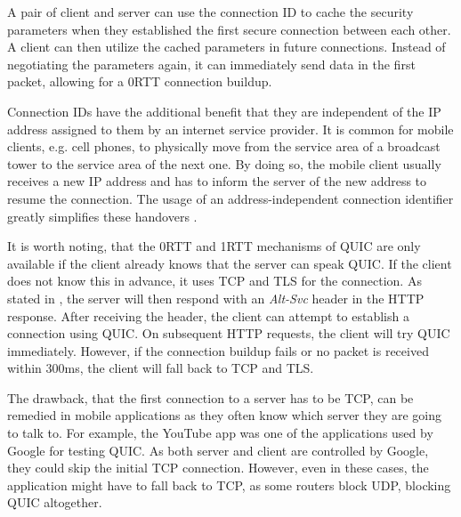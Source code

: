 \documentclass[conference]{IEEEtran}
\begin{document}
A pair of client and server can use the connection ID to cache the security parameters when they established the first secure connection between each other. A client can then utilize the cached parameters in future connections. Instead of negotiating the parameters again, it can immediately send data in the first packet, allowing for a 0RTT connection buildup.

Connection IDs have the additional benefit that they are independent of the IP address assigned to them by an internet service provider. It is common for mobile clients, e.g. cell phones, to physically move from the service area of a broadcast tower to the service area of the next one. By doing so, the mobile client usually receives a new IP address and has to inform the server of the new address to resume the connection. The usage of an address-independent connection identifier greatly simplifies these handovers \cite{HowQuickIsQuic}.

It is worth noting, that the 0RTT and 1RTT mechanisms of QUIC are only available if the client already knows that the server can speak QUIC. If the client does not know this in advance, it uses TCP and TLS for the connection. As stated in \cite{Google}, the server will then respond with an \textit{Alt-Svc} header in the HTTP response. After receiving the header, the client can attempt to establish a connection using QUIC. On subsequent HTTP requests, the client will try QUIC immediately. However, if the connection buildup fails or no packet is received within 300ms, the client will fall back to TCP and TLS.

The drawback, that the first connection to a server has to be TCP, can be remedied in mobile applications as they often know which server they are going to talk to. For example, the YouTube app was one of the applications used by Google for testing QUIC. As both server and client are controlled by Google, they could skip the initial TCP connection. However, even in these cases, the application might have to fall back to TCP, as some routers block UDP, blocking QUIC altogether.

\end{document}
